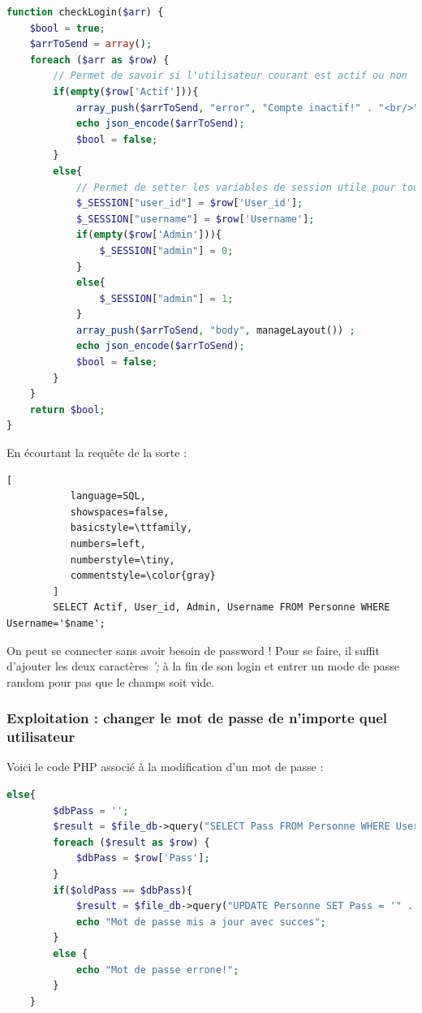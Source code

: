 \documentclass[12pt]{article}
\begin{document}
\begin{lstlisting}[language=PHP]
function checkLogin($arr) {
    $bool = true;
    $arrToSend = array();
    foreach ($arr as $row) {
        // Permet de savoir si l'utilisateur courant est actif ou non
        if(empty($row['Actif'])){
            array_push($arrToSend, "error", "Compte inactif!" . "<br/>") ;
            echo json_encode($arrToSend);
            $bool = false;
        }
        else{
            // Permet de setter les variables de session utile pour toute la connection
            $_SESSION["user_id"] = $row['User_id'];
            $_SESSION["username"] = $row['Username'];
            if(empty($row['Admin'])){
                $_SESSION["admin"] = 0;
            }
            else{
                $_SESSION["admin"] = 1;
            }
            array_push($arrToSend, "body", manageLayout()) ;
            echo json_encode($arrToSend);
            $bool = false;
        }
    }
    return $bool;
}
\end{lstlisting}

En écourtant la requête de la sorte : 

\begin{lstlisting}[
           language=SQL,
           showspaces=false,
           basicstyle=\ttfamily,
           numbers=left,
           numberstyle=\tiny,
           commentstyle=\color{gray}
        ]
        SELECT Actif, User_id, Admin, Username FROM Personne WHERE Username='$name';
\end{lstlisting}

On peut se connecter sans avoir besoin de password ! Pour se faire, il suffit d'ajouter les deux caractères \textit{';} à la fin de son login et entrer un mode de passe random pour pas que le champs soit vide.

\subsubsection{Exploitation : changer le mot de passe de n'importe quel utilisateur}
Voici le code PHP associé à la modification d'un mot de passe : 
\begin{lstlisting}[language=PHP]
    else{
        $dbPass = '';
        $result = $file_db->query("SELECT Pass FROM Personne WHERE User_id ='" . $user_id . "';");
        foreach ($result as $row) {
            $dbPass = $row['Pass'];
        }
        if($oldPass == $dbPass){
            $result = $file_db->query("UPDATE Personne SET Pass = '" . $newPass . "' WHERE User_id ='" . $user_id . "';");
            echo "Mot de passe mis a jour avec succes";
        }
        else {
            echo "Mot de passe errone!";
        }
    }
\end{lstlisting}
\end{document}
